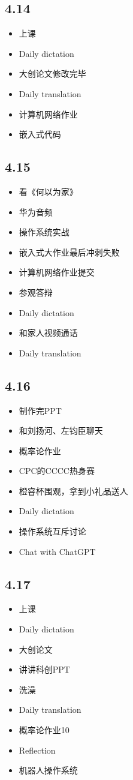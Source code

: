 \documentclass[UTF8]{ctexart}
\begin{document}
\subsection*{4.14}
\begin{itemize}
    \item 上课
    \item Daily dictation
    \item 大创论文修改完毕
    \item Daily translation
    \item 计算机网络作业
    \item 嵌入式代码
\end{itemize}
\subsection*{4.15}
\begin{itemize}
    \item 看《何以为家》
    \item 华为音频
    \item 操作系统实战
    \item 嵌入式大作业最后冲刺失败
    \item 计算机网络作业提交
    \item 参观答辩
    \item Daily dictation
    \item 和家人视频通话
    \item Daily translation
\end{itemize}
\subsection*{4.16}
\begin{itemize}
    \item 制作完PPT
    \item 和刘扬河、左钧臣聊天
    \item 概率论作业
    \item CPC的CCCC热身赛
    \item 橙睿杯围观，拿到小礼品送人
    \item Daily dictation
    \item 操作系统互斥讨论
    \item Chat with ChatGPT
\end{itemize}
\subsection*{4.17}
\begin{itemize}
    \item 上课
    \item Daily dictation
    \item 大创论文
    \item 讲讲科创PPT
    \item 洗澡
    \item Daily translation
    \item 概率论作业10
    \item Reflection
    \item 机器人操作系统
\end{itemize}
\end{document}
